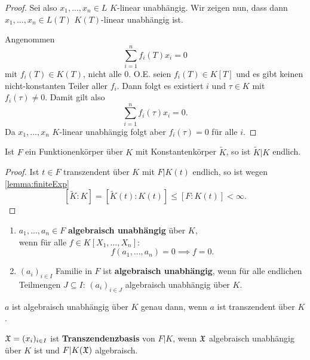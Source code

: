 \begin{proof}
    Sei also $x_1,...,x_n \in L$ $K$-linear unabhängig. Wir zeigen nun, dass dann
    $x_1,...,x_n \in L(T)$ $K(T)$-linear unabhängig ist.
    
    Angenommen $$ \sum\limits_{i=1}^n f_i(T)x_i = 0$$ mit $f_i(T) \in K(T)$, nicht alle 0.
    O.E. seien $f_i(T) \in K[T]$ und es gibt keinen nicht-konstanten Teiler aller $f_i$.
    Dann folgt es existiert $i$ und $\tau \in K$ mit $f_i(\tau) \neq 0$. 
    Damit gilt also $$ \sum\limits_{i=1}^n f_i(\tau)x_i = 0.$$
    Da $x_1,...,x_n$ $K$-linear unabhängig folgt aber $f_i(\tau) = 0$ für alle $i$.

\end{proof}

\begin{satz}\label{satz:1.9}
    Ist $F$ ein Funktionenkörper über $K$ mit Konstantenkörper $\widetilde{K}$,
    so ist $\widetilde{K}|K$ endlich.
\end{satz}
\begin{proof}
    Ist $t\in F$ transzendent über $K$ mit $F|K(t)$ endlich,
    so ist wegen \cref{lemma:finiteExp} 
    $$ [\widetilde{K}:K] = [\widetilde{K}(t):K(t)] \leq [F:K(t)] < \infty.$$
\end{proof}

\begin{definition}
    \begin{enumerate}[label=\arabic*)]
        \item $a_1,...,a_n \in F$ \textbf{algebraisch unabhängig} über $K$,\\
        wenn für alle $f \in K[X_1,...,X_n]$:
        $$ f(a_1,...,a_n) = 0 \implies f=0. $$

        \item $(a_i)_{i \in I}$ Familie in $F$ ist \textbf{algebraisch unabhängig},
        wenn für alle endlichen Teilmengen $J \subseteq I$:
        $ (a_i)_{i \in J}$ algebraisch unabhängig über $K$.
    \end{enumerate}
\end{definition}

\begin{beispiel}
    $a$ ist algebraisch unabhängig über $K$ genau dann, wenn $a$ ist transzendent über $K$.
\end{beispiel}

\begin{definition}
    $\mathfrak{X} = (x_i)_{i \in I}$ ist \textbf{Transzendenzbasis} von $F|K$, 
    wenn $\mathfrak{X}$ algebraisch unabhängig über $K$ ist und $F|K(\mathfrak{X})$ algebraisch.
\end{definition}

